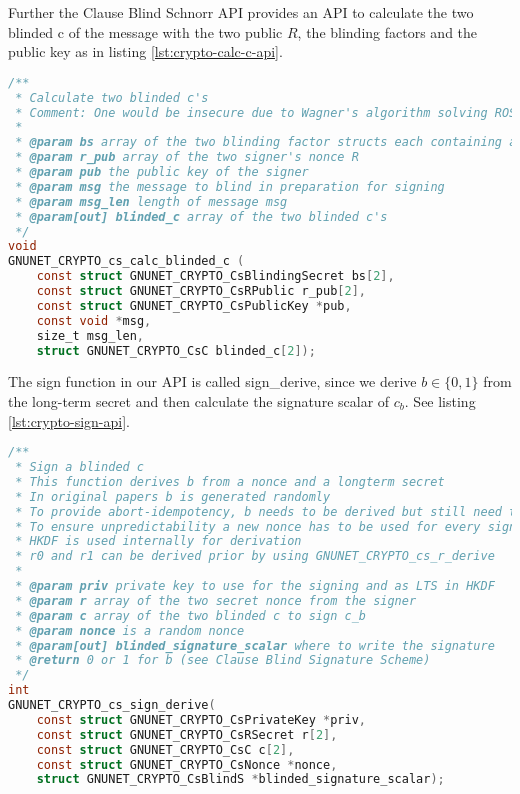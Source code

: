 Further the Clause Blind Schnorr API provides an API to calculate the two blinded c of the message with the two public $R$, the blinding factors and the public key as in listing \ref{lst:crypto-calc-c-api}.

\begin{lstlisting}[style=bfh-c,language=C, caption={GNUnet calculate blinded c API}, label={lst:crypto-calc-c-api}]
/**
 * Calculate two blinded c's
 * Comment: One would be insecure due to Wagner's algorithm solving ROS
 * 
 * @param bs array of the two blinding factor structs each containing alpha and beta
 * @param r_pub array of the two signer's nonce R
 * @param pub the public key of the signer
 * @param msg the message to blind in preparation for signing
 * @param msg_len length of message msg
 * @param[out] blinded_c array of the two blinded c's
 */
void
GNUNET_CRYPTO_cs_calc_blinded_c (
    const struct GNUNET_CRYPTO_CsBlindingSecret bs[2],
    const struct GNUNET_CRYPTO_CsRPublic r_pub[2],
    const struct GNUNET_CRYPTO_CsPublicKey *pub,
    const void *msg,
    size_t msg_len,
    struct GNUNET_CRYPTO_CsC blinded_c[2]);
\end{lstlisting}

The sign function in our API is called sign\_derive, since we derive $b \in \{0,1\}$ from the long-term secret and then calculate the signature scalar of $c_b$.
See listing \ref{lst:crypto-sign-api}.

\begin{lstlisting}[style=bfh-c,language=C, caption={GNUnet sign API}, label={lst:crypto-sign-api}]
/**
 * Sign a blinded c
 * This function derives b from a nonce and a longterm secret
 * In original papers b is generated randomly
 * To provide abort-idempotency, b needs to be derived but still need to be UNPREDICTABLE.
 * To ensure unpredictability a new nonce has to be used for every signature
 * HKDF is used internally for derivation
 * r0 and r1 can be derived prior by using GNUNET_CRYPTO_cs_r_derive
 * 
 * @param priv private key to use for the signing and as LTS in HKDF
 * @param r array of the two secret nonce from the signer
 * @param c array of the two blinded c to sign c_b
 * @param nonce is a random nonce
 * @param[out] blinded_signature_scalar where to write the signature
 * @return 0 or 1 for b (see Clause Blind Signature Scheme)
 */
int
GNUNET_CRYPTO_cs_sign_derive(
    const struct GNUNET_CRYPTO_CsPrivateKey *priv,
    const struct GNUNET_CRYPTO_CsRSecret r[2],
    const struct GNUNET_CRYPTO_CsC c[2],
    const struct GNUNET_CRYPTO_CsNonce *nonce,
    struct GNUNET_CRYPTO_CsBlindS *blinded_signature_scalar);
\end{lstlisting}

